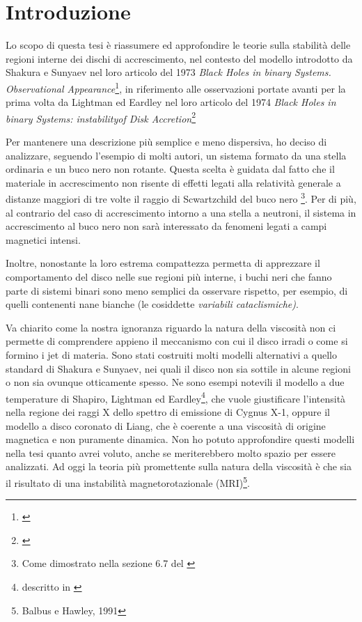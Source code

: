 \documentclass[a4paperbi]{article}
\begin{document}
\section{Introduzione}
	Lo scopo di questa tesi è riassumere ed approfondire le teorie sulla stabilità delle regioni interne dei dischi di accrescimento, nel contesto del modello introdotto da Shakura e Sunyaev nel loro articolo del 1973 \textit{Black Holes in binary Systems. Observational Appearance}\footnote{\cite{ShakuraSunyaev1973}}, in riferimento alle osservazioni portate avanti per la prima volta da Lightman ed Eardley nel loro articolo del 1974 \textit{Black Holes in binary Systems: instabilityof Disk Accretion}\footnote{\cite{LightmanEardley1974}}

	Per mantenere una descrizione più semplice e meno dispersiva, ho deciso di analizzare, seguendo l'esempio di molti autori, un sistema formato da una stella ordinaria e un buco nero non rotante. Questa scelta è guidata dal fatto che il materiale in accrescimento non risente di effetti legati alla relatività generale a distanze maggiori di tre volte il raggio di Scwartzchild del buco nero
\footnote{Come dimostrato nella sezione 6.7 del \cite{FrankKingRaineAccretionPower}}. Per di più, al contrario del caso di accrescimento intorno a una stella a neutroni, il sistema in accrescimento al buco nero non sarà interessato da fenomeni legati a campi magnetici intensi. 

	Inoltre, nonostante la loro estrema compattezza permetta di apprezzare il comportamento del disco nelle sue regioni più interne, i buchi neri che fanno parte di sistemi binari sono meno semplici da osservare rispetto, per esempio, di quelli contenenti nane bianche (le cosiddette \textit{variabili cataclismiche)}.

	Va chiarito come la nostra ignoranza riguardo la natura della viscosità non ci permette di comprendere appieno il meccanismo con cui il disco irradi o come si formino i jet di materia. Sono stati costruiti molti modelli alternativi a quello standard di Shakura e Sunyaev, nei quali il disco non sia sottile in alcune regioni o non sia ovunque otticamente spesso. Ne sono esempi notevili il modello a due temperature di Shapiro, Lightman ed Eardley\footnote{descritto in \cite{ShapiroLightmanEardley1976}}, che vuole giustificare l'intensità nella regione dei raggi X dello spettro di emissione di Cygnus X-1, oppure il modello a disco coronato di Liang, che è coerente a una viscosità di origine magnetica e non puramente dinamica. Non ho potuto approfondire questi modelli nella tesi quanto avrei voluto, anche se meriterebbero molto spazio per essere analizzati. Ad oggi la teoria più promettente sulla natura della viscosità è che sia il risultato di una instabilità magnetorotazionale (MRI)\footnote{Balbus e Hawley, 1991}.
\end{document}
